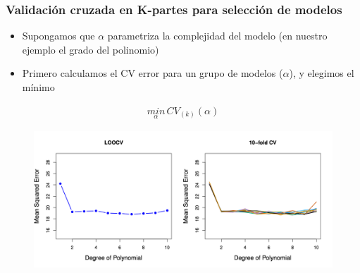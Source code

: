 \documentclass[
  shownotes,
  xcolor={svgnames},
  hyperref={colorlinks,citecolor=DarkBlue,linkcolor=DarkRed,urlcolor=DarkBlue}
  , aspectratio=169]{beamer}
\begin{document}
\begin{frame}[fragile]
\frametitle{Validación cruzada en K-partes para selección de modelos}

\begin{itemize}
  \item Supongamos que $\alpha$ parametriza la complejidad del modelo (en nuestro ejemplo el grado del polinomio)
  \medskip
  \item Primero calculamos el CV error para un grupo de modelos ($\alpha$), y elegimos el mínimo

\end{itemize}
\begin{align}
\underset{\alpha}{min} \, CV_{(k)}(\alpha)
\end{align}

        \begin{figure}[H] \centering
            \captionsetup{justification=centering}
              \includegraphics[scale=0.5]{figures/fig54.png}
       \end{figure}

\end{frame}
\end{document}
